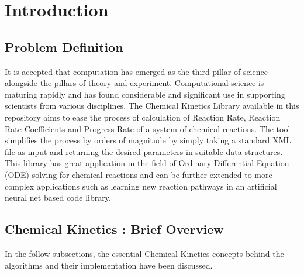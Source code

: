 \chapter{Introduction}

\section{Problem Definition}
It is accepted that computation has emerged as the third pillar of science alongside the pillars of theory and experiment. Computational science is maturing rapidly and has found considerable and significant use in supporting scientists from various disciplines. The Chemical Kinetics Library available in this repository aims to ease the process of calculation of Reaction Rate, Reaction Rate Coefficients and Progress Rate of a system of chemical reactions. The tool simplifies the process by orders of magnitude by simply taking a standard XML file as input and returning the desired parameters in suitable data structures. This library has great application in the field of Ordinary Differential Equation (ODE) solving for chemical reactions and can be further extended to more complex applications such as learning new reaction pathways in an artificial neural net based code library. 


\section{Chemical Kinetics : Brief Overview}
In the follow subsections, the essential Chemical Kinetics concepts behind the algorithms and their implementation have been discussed.
